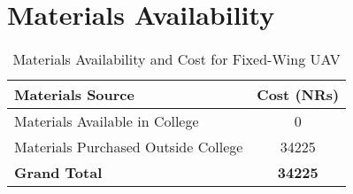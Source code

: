 \section*{Materials Availability}
\begin{table}[h]
\centering
\begin{tabular}{l S[table-format=5.0]}
\toprule
\textbf{Materials Source} & \textbf{Cost (NRs)} \\
\midrule
Materials Available in College & 0 \\
Materials Purchased Outside College & 34225 \\
\midrule
\textbf{Grand Total} & \textbf{34225} \\
\bottomrule
\end{tabular}
\caption{Materials Availability and Cost for Fixed-Wing UAV}
\end{table}

